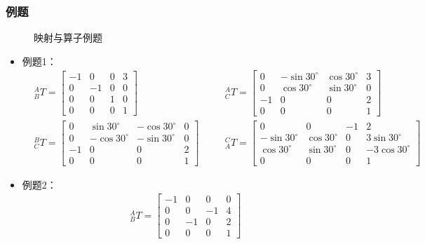 \documentclass[
12pt, %
a4paper, 
oneside, %
headinclude,footinclude, %
]{scrartcl}
\begin{document}
\subsubsection[例题]{例题}
\begin{figure}[H]
\centering
\subfloat[例题1]{\texttt{[image: 9.1]}} \quad
\subfloat[例题2]{\texttt{[image: 9.2]}}
\caption{映射与算子例题}
\end{figure}

\begin{itemize}
\item 例题1：
\begin{align*}
&{}^A_B T = \begin{bmatrix} -1 & 0 & 0 & 3 \\ 0 & -1 & 0 & 0 \\ 0 & 0 & 1 & 0 \\ 0 & 0 & 0 & 1 \end{bmatrix} \quad &
&{}^A_C T = \begin{bmatrix} 0 & -\sin 30^\circ & \cos 30^\circ & 3 \\ 0 & \cos 30^\circ & \sin 30^\circ & 0 \\ -1 & 0 & 0 & 2 \\ 0 & 0 & 0 & 1 \end{bmatrix} \\
&{}^B_C T = \begin{bmatrix} 0 & \sin 30^\circ & -\cos 30^\circ & 0 \\ 0 & -\cos 30^\circ & -\sin 30^\circ & 0 \\ -1 & 0 & 0 & 2 \\ 0 & 0 & 0 & 1 \end{bmatrix} \quad &
&{}^C_A T = \begin{bmatrix} 0 & 0 & -1 & 2 \\ -\sin 30^\circ & \cos 30^\circ & 0 & 3\sin 30^\circ \\ \cos 30^\circ & \sin 30^\circ & 0 & -3\cos 30^\circ \\ 0 & 0 & 0 & 1 \end{bmatrix}
\end{align*}
\item 例题2：
\begin{align*}
&{}^A_B T = \begin{bmatrix} -1 & 0 & 0 & 0 \\ 0 & 0 & -1 & 4 \\ 0 & -1 & 0 & 2 \\ 0 & 0 & 0 & 1 \end{bmatrix} \quad &

\end{align*}
\end{itemize}
\end{document}
